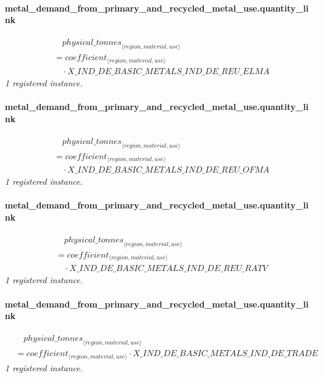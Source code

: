 \documentclass[11pt]{article}
\begin{document}
\paragraph{metal\_demand\_from\_primary\_and\_recycled\_metal\_use.quantity\_link}
\begin{align*}
&\quad {physical\_tonnes}_{\langle region, material, use\rangle}\\
&= coefficient_{\langle region, material, use\rangle}\\
&\quad {}\cdot X\_IND\_DE\_BASIC\_METALS\_IND\_DE\_REU\_ELMA
\end{align*}
\noindent\emph{1 registered instance.}\par
\paragraph{metal\_demand\_from\_primary\_and\_recycled\_metal\_use.quantity\_link}
\begin{align*}
&\quad {physical\_tonnes}_{\langle region, material, use\rangle}\\
&= coefficient_{\langle region, material, use\rangle}\\
&\quad {}\cdot X\_IND\_DE\_BASIC\_METALS\_IND\_DE\_REU\_OFMA
\end{align*}
\noindent\emph{1 registered instance.}\par
\paragraph{metal\_demand\_from\_primary\_and\_recycled\_metal\_use.quantity\_link}
\begin{align*}
&\quad {physical\_tonnes}_{\langle region, material, use\rangle}\\
&= coefficient_{\langle region, material, use\rangle}\\
&\quad {}\cdot X\_IND\_DE\_BASIC\_METALS\_IND\_DE\_REU\_RATV
\end{align*}
\noindent\emph{1 registered instance.}\par
\paragraph{metal\_demand\_from\_primary\_and\_recycled\_metal\_use.quantity\_link}
\begin{align*}
&\quad {physical\_tonnes}_{\langle region, material, use\rangle}\\
&= coefficient_{\langle region, material, use\rangle} \cdot X\_IND\_DE\_BASIC\_METALS\_IND\_DE\_TRADE
\end{align*}
\noindent\emph{1 registered instance.}\par
\end{document}
